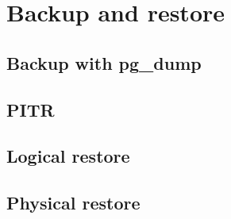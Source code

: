 \chapter{Backup and restore}
\section{Backup with pg\_dump}
\section{PITR}
\section{Logical restore}
\section{Physical restore}